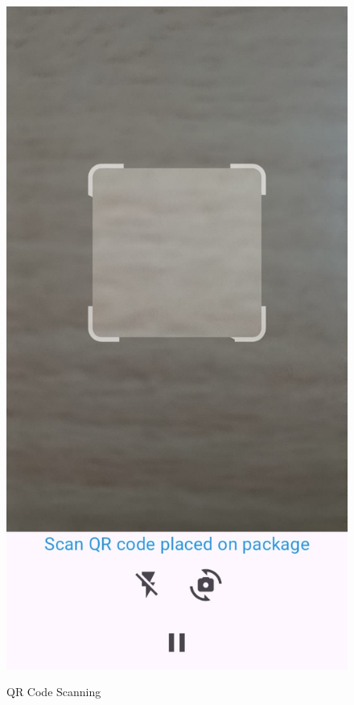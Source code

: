 \begin{figure}[H]
\begin{minipage}{0.24\textwidth}
    \label{fig:qr1}
\end{minipage}%
\hspace{5mm}
\begin{minipage}{0.24\textwidth}
    \centering
    \includegraphics[width=\linewidth]{6/qr2.jpg}
    \label{fig:qr2}
\end{minipage}
\caption{QR Code Scanning}
\label{fig:qrcodes1}
\end{figure}
